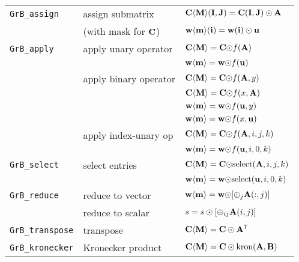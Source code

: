 \documentclass[12pt]{article}
\begin{document}
{\begin{tabular}{lll}
\hline
\verb'GrB_assign'    & assign submatrix        & ${\bf C \langle M \rangle (I,J) = C(I,J) \odot A}$ \\
                     & (with mask for ${\bf C}$)
                                               & ${\bf w \langle m \rangle (i)   = w(i)   \odot u}$ \\
\hline
\verb'GrB_apply'     & apply unary operator    & ${\bf C \langle M \rangle = C \odot} f{\bf (A)}$ \\
                     &                         & ${\bf w \langle m \rangle = w \odot} f{\bf (u)}$ \\
                     & apply binary operator   & ${\bf C \langle M \rangle = C \odot} f({\bf A},y)$ \\
                     &                         & ${\bf C \langle M \rangle = C \odot} f(x,{\bf A})$ \\
                     &                         & ${\bf w \langle m \rangle = w \odot} f({\bf u},y)$ \\
                     &                         & ${\bf w \langle m \rangle = w \odot} f(x,{\bf u})$ \\
                     & apply index-unary op    & ${\bf C \langle M \rangle = C \odot} f({\bf A},i,j,k)$ \\
                     &                         & ${\bf w \langle m \rangle = w \odot} f({\bf u},i,0,k)$ \\
\hline
\verb'GrB_select'    & select entries          & ${\bf C \langle M \rangle = C \odot} \mbox{select}({\bf A},i,j,k)$ \\
                     &                         & ${\bf w \langle m \rangle = w \odot} \mbox{select}({\bf u},i,0,k)$ \\
\hline
\verb'GrB_reduce'    & reduce to vector        & ${\bf w \langle m \rangle = w \odot} [{\oplus}_j {\bf A}(:,j)]$ \\
                     & reduce to scalar        & $s = s \odot [{\oplus}_{ij}  {\bf A}(i,j)]$ \\
\hline
\verb'GrB_transpose' & transpose               & ${\bf C \langle M \rangle = C \odot A^{\sf T}}$ \\
\hline
\verb'GrB_kronecker' & Kronecker product       & ${\bf C \langle M \rangle = C \odot \mbox{kron}(A, B)}$ \\
\hline
\end{tabular}
}
\vspace{0.15in}

\newpage
\end{document}
